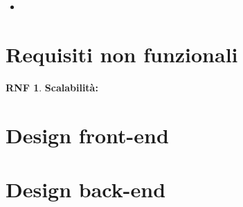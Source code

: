 \documentclass[11pt, a4paper]{article}
\theoremstyle{definition}
\newtheorem{nonfuncreq}{RNF} %
\begin{document}
\begin{itemize}
    \item 
\end{itemize}


\section{Requisiti non funzionali}

\begin{nonfuncreq}
\label{scalabilita}
\textbf{Scalabilità:}
\end{nonfuncreq}

\section{Design front-end}

\section{Design back-end}
\end{document}
